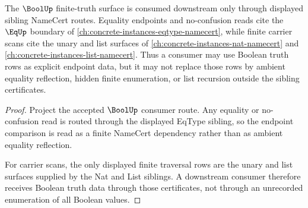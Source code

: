 \begin{theorem}
\label{thm:bool-finite-truth-sibling-dependency-route}
The $\BoolUp$ finite-truth surface is consumed downstream only through displayed sibling NameCert routes. Equality endpoints and no-confusion reads cite the $\EqUp$ boundary of \autoref{ch:concrete-instances-eqtype-namecert}, while finite carrier scans cite the unary and list surfaces of \autoref{ch:concrete-instances-nat-namecert} and \autoref{ch:concrete-instances-list-namecert}. Thus a consumer may use Boolean truth rows as explicit endpoint data, but it may not replace those rows by ambient equality reflection, hidden finite enumeration, or list recursion outside the sibling certificates.
\end{theorem}
\begin{proof}
Project the accepted $\BoolUp$ consumer route. Any equality or no-confusion read is routed through the displayed EqType sibling, so the endpoint comparison is read as a finite NameCert dependency rather than as ambient equality reflection.

For carrier scans, the only displayed finite traversal rows are the unary and list surfaces supplied by the Nat and List siblings. A downstream consumer therefore receives Boolean truth data through those certificates, not through an unrecorded enumeration of all Boolean values.
\end{proof}
